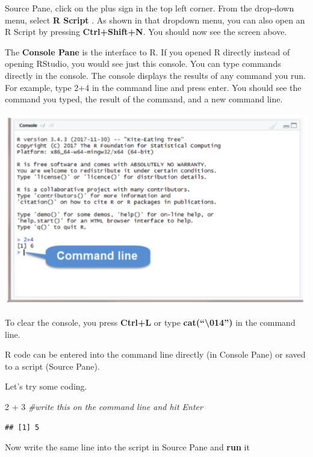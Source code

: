 \documentclass[
]{book}
\newenvironment{Shaded}{\begin{snugshade}}{\end{snugshade}}
\newcommand{\CommentTok}[1]{\textcolor[rgb]{0.56,0.35,0.01}{\textit{#1}}}
\newcommand{\DecValTok}[1]{\textcolor[rgb]{0.00,0.00,0.81}{#1}}
\newcommand{\SpecialCharTok}[1]{\textcolor[rgb]{0.00,0.00,0.00}{#1}}
\theoremstyle{definition}
\theoremstyle{definition}
\theoremstyle{definition}
\theoremstyle{definition}
\theoremstyle{remark}
\begin{document}
Source Pane, click on the plus sign in the top left corner. From the drop-down menu, select \textbf{R Script} . As shown in that dropdown menu, you can also open an R Script by pressing \textbf{Ctrl+Shift+N}. You should now see the screen above.

The \textbf{Console Pane} is the interface to R. If you opened R directly instead of opening RStudio, you would see just this console. You can type commands directly in the console. The console displays the results of any command you run. For example, type 2+4 in the command line and press enter. You should see the command you typed, the result of the command, and a new command line.

\includegraphics[width=8.24in]{png/Rstudio2}

To clear the console, you press \textbf{Ctrl+L} or type \textbf{cat(``\textbackslash014'')} in the command line.

R code can be entered into the command line directly (in Console Pane) or saved to a script (Source Pane).

Let's try some coding.

\begin{Shaded}
\begin{Highlighting}[]
\DecValTok{2} \SpecialCharTok{+} \DecValTok{3} \CommentTok{\#write this on the command line and hit Enter}
\end{Highlighting}
\end{Shaded}

\begin{verbatim}
## [1] 5
\end{verbatim}

Now write the same line into the script in Source Pane and \textbf{run} it
\end{document}
